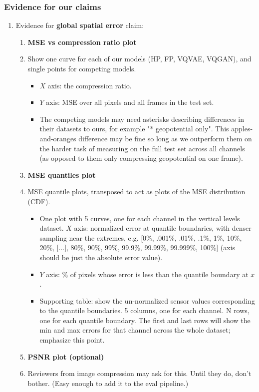 \subsubsection{Evidence for our claims}
\begin{enumerate}
    \item Evidence for \textbf{global spatial error} claim:
    \begin{enumerate}
        \item \textbf{MSE vs compression ratio plot}
        \item[] Show one curve for each of our models (HP, FP, VQVAE, VQGAN), and single points for competing models.
        \begin{itemize}
            \item $X$ axis: the compression ratio. 
            \item $Y$ axis: MSE over all pixels and all frames in the test set. 
            \item The competing models may need asterisks describing differences in their datasets to ours, for example "* geopotential only". This apples-and-oranges difference may be fine so long as we outperform them on the harder task of measuring on the full test set across all channels (as opposed to them only compressing geopotential on one frame).
        \end{itemize}
        \item \textbf{MSE quantiles plot}
        \item[] MSE quantile plots, transposed to act as plots of the MSE distribution (CDF).
        \begin{itemize}
            \item One plot with 5 curves, one for each channel in the vertical levels dataset. \newline $X$ axis: normalized error at quantile boundaries, with denser sampling near the extremes, e.g. [0\%, .001\%, .01\%, .1\%, 1\%, 10\%, 20\%, [...], 80\%, 90\%, 99\%, 99.9\%, 99.99\%, 99.999\%, 100\%] (axis should be just the absolute error value). 
            \item $Y$ axis: \% of pixels whose error is less than the quantile boundary at $x$. 
            \item Supporting table: show the un-normalized sensor values corresponding to the quantile boundaries. 5 columns, one for each channel. N rows, one for each quantile boundary. The first and last rows will show the min and max errors for that channel across the whole dataset; emphasize this point.
        \end{itemize}
    \item \textbf{PSNR plot (optional)}
    \item[] Reviewers from image compression may ask for this. Until they do, don't bother. (Easy enough to add it to the eval pipeline.)
    \end{enumerate}
    

\end{enumerate}
